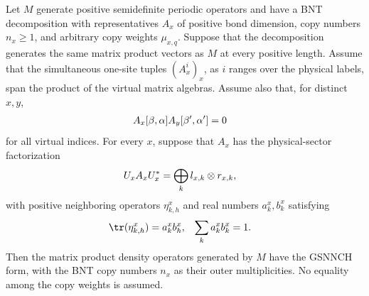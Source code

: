 \begin{lemma}
    \label{thm:mpdo_bnt_physical_sector_gsnnch}
    \leanok
    Let $M$ generate positive semidefinite periodic operators and have a BNT
    decomposition with representatives $A_x$ of positive bond dimension,
    copy numbers $n_x\geq1$, and arbitrary copy weights $\mu_{x,q}$.
    Suppose that the decomposition generates the same matrix product vectors
    as $M$ at every positive length.  Assume that the simultaneous one-site
    tuples $(A_x^i)_x$, as $i$ ranges over the physical labels, span the
    product of the virtual matrix algebras.  Assume also that, for distinct
    $x,y$,
    \begin{align}
        A_x[\beta,\alpha]A_y[\beta',\alpha'] & =0
        \notag
    \end{align}
    for all virtual indices.  For every $x$, suppose that $A_x$ has the
    physical-sector factorization
    \begin{align}
        U_xA_xU_x^* & =\bigoplus_k l_{x,k}\otimes r_{x,k},
        \notag
    \end{align}
    with positive neighboring operators $\eta^x_{k,h}$ and real numbers
    $a^x_k,b^x_k$ satisfying
    \begin{align}
        \tr(\eta^x_{k,h}) & =a^x_kb^x_h,
                          &
        \sum_k a^x_kb^x_k & =1.
        \notag
    \end{align}
    Then the matrix product density operators generated by $M$ have the
    GSNNCH form, with the BNT copy numbers $n_x$ as their outer
    multiplicities.  No equality among the copy weights is assumed.
\end{lemma}

